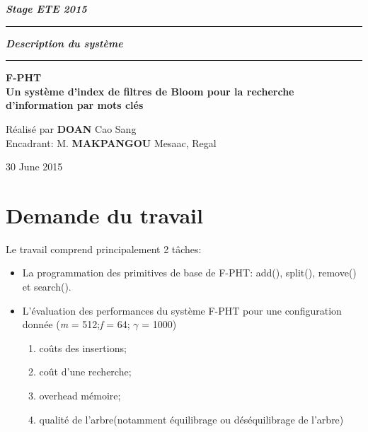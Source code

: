 \documentclass[a4paper,11pt]{report}
\begin{document}
	\begin{titlepage}
		\begin{center}
			\large\bfseries\itshape Stage ETE 2015\\
		\end{center}
		\noindent\rule{\linewidth}{3pt}

		\begin{center}
			\Huge\bfseries\itshape Description du système\\
		\end{center}
		
		\noindent\rule{\linewidth}{3pt}
		\begin{center}
			\bfseries
			\large F-PHT \\
			\large Un système d'index de filtres de Bloom pour la recherche d'information par mots clés
		\end{center}
		\begin{center}
			Réalisé par \textbf{DOAN} Cao Sang \\
			Encadrant: M. \textbf{MAKPANGOU} Mesaac, Regal
		\end{center}
		\begin{center}
			30 June 2015
		\end{center}
	\end{titlepage}

\tableofcontents

\chapter{Demande du travail}
Le travail comprend principalement 2 tâches:
\begin{itemize}
	\item La programmation des primitives de base de F-PHT: add(), split(), remove() et search().
	\item L'évaluation des performances du système F-PHT pour une configuration donnée (\textit{m} = 512;\textit{f} = 64; $\gamma$ = 1000)
			\begin{enumerate}
				\item coûts des insertions;
				\item coût d'une recherche;
				\item overhead mémoire;
				\item qualité de l'arbre(notamment équilibrage ou déséquilibrage de l'arbre)
			\end{enumerate}
\end{itemize}
\end{document}
